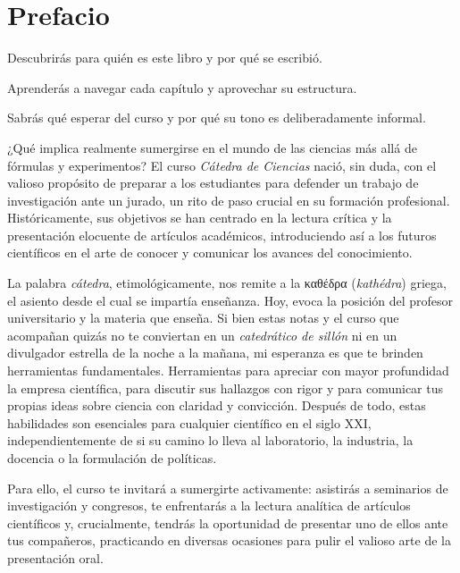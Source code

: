 \chapter{Prefacio}
\label{cha:prefacio}

\begin{enestecapitulo}
	\item[\emoji{books}] Descubrirás para quién es este libro y por qué se escribió.
	\item[\emoji{world-map}] Aprenderás a navegar cada capítulo y aprovechar su estructura.
	\item[\emoji{light-bulb}] Sabrás qué esperar del curso y por qué su tono es deliberadamente informal.
\end{enestecapitulo}

¿Qué implica realmente sumergirse en el mundo de las ciencias más allá de fórmulas y experimentos?
El curso \emph{Cátedra de Ciencias} nació, sin duda, con el valioso propósito de preparar a los estudiantes para defender un trabajo de investigación ante un jurado, un rito de paso crucial en su formación profesional.
Históricamente, sus objetivos se han centrado en la lectura crítica y la presentación elocuente de artículos académicos, introduciendo así a los futuros científicos en el arte de conocer y comunicar los avances del conocimiento.

La palabra \emph{cátedra}, etimológicamente, nos remite a la καθέδρα (\emph{kathédra}) griega, el asiento desde el cual se impartía enseñanza.
Hoy, evoca la posición del profesor universitario y la materia que enseña.
Si bien estas notas y el curso que acompañan quizás no te conviertan en un \emph{catedrático de sillón} ni en un divulgador estrella de la noche a la mañana, mi esperanza es que te brinden herramientas fundamentales.
Herramientas para apreciar con mayor profundidad la empresa científica, para discutir sus hallazgos con rigor y para comunicar tus propias ideas sobre ciencia con claridad y convicción.
Después de todo, estas habilidades son esenciales para cualquier científico en el siglo \textsc{XXI}, independientemente de si su camino lo lleva al laboratorio, la industria, la docencia o la formulación de políticas.

Para ello, el curso te invitará a sumergirte activamente: asistirás a seminarios de investigación y congresos, te enfrentarás a la lectura analítica de artículos científicos y, crucialmente, tendrás la oportunidad de presentar uno de ellos ante tus compañeros, practicando en diversas ocasiones para pulir el valioso arte de la presentación oral.

